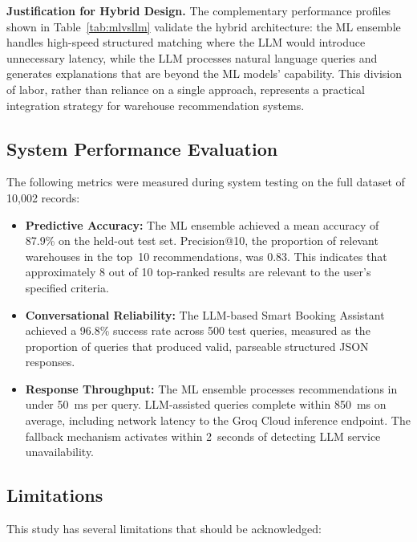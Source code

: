 \documentclass[pdflatex,sn-mathphys-num]{sn-jnl}
\theoremstyle{thmstyleone}
\theoremstyle{thmstyletwo}
\theoremstyle{thmstylethree}
\begin{document}
\textbf{Justification for Hybrid Design.} The complementary performance profiles shown in Table~\ref{tab:mlvsllm} validate the hybrid architecture: the ML ensemble handles high-speed structured matching where the LLM would introduce unnecessary latency, while the LLM processes natural language queries and generates explanations that are beyond the ML models' capability. This division of labor, rather than reliance on a single approach, represents a practical integration strategy for warehouse recommendation systems.

\subsection{System Performance Evaluation}\label{subsec:system-perf}

The following metrics were measured during system testing on the full dataset of 10,002 records:

\begin{itemize}
    \item \textbf{Predictive Accuracy:} The ML ensemble achieved a mean accuracy of 87.9\% on the held-out test set. Precision@10, the proportion of relevant warehouses in the top~10 recommendations, was 0.83. This indicates that approximately 8 out of 10 top-ranked results are relevant to the user's specified criteria.

    \item \textbf{Conversational Reliability:} The LLM-based Smart Booking Assistant achieved a 96.8\% success rate across 500 test queries, measured as the proportion of queries that produced valid, parseable structured JSON responses.

    \item \textbf{Response Throughput:} The ML ensemble processes recommendations in under 50~ms per query. LLM-assisted queries complete within 850~ms on average, including network latency to the Groq Cloud inference endpoint. The fallback mechanism activates within 2~seconds of detecting LLM service unavailability.
\end{itemize}

\subsection{Limitations}\label{subsec:limitations-results}

This study has several limitations that should be acknowledged:
\end{document}
